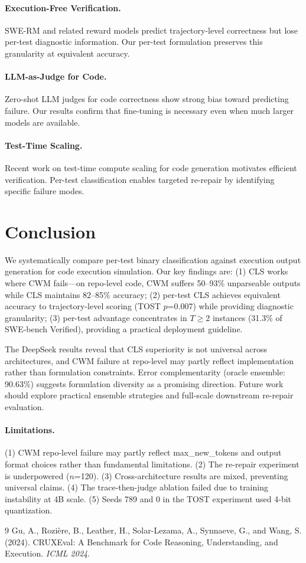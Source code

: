 \documentclass[11pt,a4paper]{article}
\begin{document}
\paragraph{Execution-Free Verification.} SWE-RM and related reward models predict trajectory-level correctness but lose per-test diagnostic information. Our per-test formulation preserves this granularity at equivalent accuracy.

\paragraph{LLM-as-Judge for Code.} Zero-shot LLM judges for code correctness show strong bias toward predicting failure. Our results confirm that fine-tuning is necessary even when much larger models are available.

\paragraph{Test-Time Scaling.} Recent work on test-time compute scaling for code generation motivates efficient verification. Per-test classification enables targeted re-repair by identifying specific failure modes.

\section{Conclusion}

We systematically compare per-test binary classification against execution output generation for code execution simulation. Our key findings are: (1) CLS works where CWM fails---on repo-level code, CWM suffers 50--93\% unparseable outputs while CLS maintains 82--85\% accuracy; (2) per-test CLS achieves equivalent accuracy to trajectory-level scoring (TOST $p$=0.007) while providing diagnostic granularity; (3) per-test advantage concentrates in $T\geq2$ instances (31.3\% of SWE-bench Verified), providing a practical deployment guideline.

The DeepSeek results reveal that CLS superiority is not universal across architectures, and CWM failure at repo-level may partly reflect implementation rather than formulation constraints. Error complementarity (oracle ensemble: 90.63\%) suggests formulation diversity as a promising direction. Future work should explore practical ensemble strategies and full-scale downstream re-repair evaluation.

\paragraph{Limitations.} (1) CWM repo-level failure may partly reflect max\_new\_tokens and output format choices rather than fundamental limitations. (2) The re-repair experiment is underpowered ($n$=120). (3) Cross-architecture results are mixed, preventing universal claims. (4) The trace-then-judge ablation failed due to training instability at 4B scale. (5) Seeds 789 and 0 in the TOST experiment used 4-bit quantization.


\begin{thebibliography}{9}
 Gu, A., Rozière, B., Leather, H., Solar-Lezama, A., Synnaeve, G., and Wang, S. (2024). CRUXEval: A Benchmark for Code Reasoning, Understanding, and Execution. \emph{ICML 2024}.
\end{thebibliography}
\end{document}
